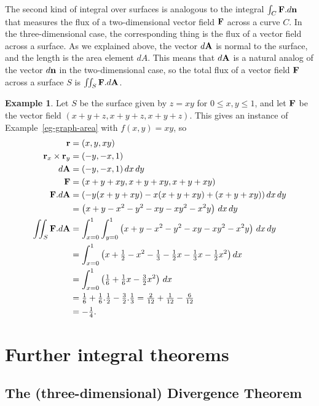 \documentclass[reqno]{amsart}
\theoremstyle{definition}
\newtheorem{example}[theorem]{Example}
\begin{document}
The second kind of integral over surfaces is analogous to the integral
$\int_C\mathbf{F}.d\mathbf{n}$ that measures the flux of a two-dimensional vector
field $\mathbf{F}$ across a curve $C$.  In the three-dimensional case, the
corresponding thing is the flux of a vector field across a surface.
As we explained above, the vector $d\mathbf{A}$ is normal to the surface, and
the length is the area element $dA$.  This means that $d\mathbf{A}$ is a
natural analog of the vector $d\mathbf{n}$ in the two-dimensional case, so
the total flux of a vector field $\mathbf{F}$ across a surface $S$ is
$\iint_S\mathbf{F}.d\mathbf{A}$.
\begin{example}
 Let $S$ be the surface given by $z=xy$ for $0\leq x,y\leq 1$, and let
 $\mathbf{F}$ be the vector field $(x+y+z,x+y+z,x+y+z)$.  This gives an
 instance of Example~\ref{eg-graph-area} with $f(x,y)=xy$, so 
 \begin{align*}
  \mathbf{r} &= (x,y,xy) \\
  \mathbf{r}_x\times\mathbf{r}_y &= (-y,-x,1) \\
  d\mathbf{A} &= (-y,-x,1)\,dx\,dy \\
  \mathbf{F} &= (x+y+xy,x+y+xy,x+y+xy) \\
  \mathbf{F}.d\mathbf{A} &= \left(-y(x+y+xy)-x(x+y+xy)+(x+y+xy)\right)dx\,dy \\
   &= \left(x+y-x^2-y^2-xy-xy^2-x^2y\right)\,dx\,dy \\
  \iint_S \mathbf{F}.d\mathbf{A} &= 
   \int_{x=0}^1 \int_{y=0}^1
    \left(x+y-x^2-y^2-xy-xy^2-x^2y\right)\,dx\,dy \\
   &= \int_{x=0}^1 
      \left(x+\tfrac{1}{2}-x^2-\tfrac{1}{3}-\tfrac{1}{2} x-\tfrac{1}{3}x-\tfrac{1}{2}
       x^2\right)dx \\
   &= \int_{x=0}^1 \left(\tfrac{1}{6} +\tfrac{1}{6}x
    -\tfrac{3}{2}x^2\right)\,dx \\
   &= \tfrac{1}{6} + \tfrac{1}{6}.\tfrac{1}{2} -\tfrac{3}{2}.\tfrac{1}{3} 
     = \tfrac{2}{12} + \tfrac{1}{12} - \tfrac{6}{12} \\
   &= -\tfrac{1}{4}.
 \end{align*}
\end{example}

\section{Further integral theorems}

\subsection{The (three-dimensional) Divergence Theorem}
\end{document}
